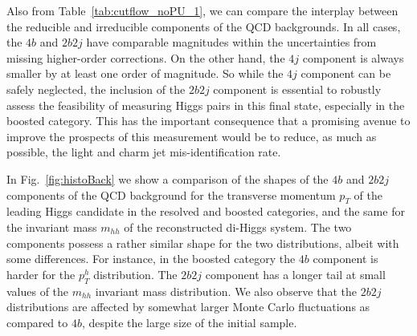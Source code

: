  Also from Table~\ref{tab:cutflow_noPU_1}, we
 can compare the interplay
 between the reducible and irreducible components of the
 QCD backgrounds.
 In all cases, the $4b$ and $2b2j$ have comparable
 magnitudes within the uncertainties from missing higher-order
 corrections.
 On the other hand, the $4j$ component
is always smaller by at least
 one order of magnitude.
  So while the $4j$ component can be safely
 neglected, the inclusion of the
 $2b2j$ component is essential to robustly assess the feasibility
 of measuring Higgs pairs in this final state,
 especially
 in the boosted category.
 This has the important
 consequence that a promising avenue to improve the prospects
 of this measurement would be to reduce, as much as possible,
 the light and charm jet mis-identification rate.

 In Fig.~\ref{fig:histoBack} we show a
 comparison
    of the shapes of the $4b$ and $2b2j$
    components of the QCD background for the transverse momentum
    $p_T$ of the leading
Higgs candidate in the resolved
and boosted  categories, and the same
 for the invariant
mass $m_{hh}$ of the
    reconstructed di-Higgs system.
    The two components possess a rather similar shape
    for the two distributions, albeit with some 
    differences.
    For instance, in the boosted
    category the $4b$ component is harder for the
    $p_T^h$ distribution.
    The $2b2j$ component has a longer
    tail at small values of the $m_{hh}$ invariant
    mass distribution.
%
    We also observe that the $2b2j$ distributions
    are affected by somewhat larger
    Monte Carlo fluctuations as compared to $4b$, despite the large size
of the initial sample.
%

